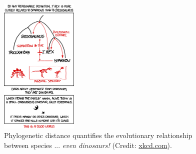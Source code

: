 \documentclass[12pt]{article}
\begin{document}
\begin{figure}
\centering
\includegraphics[width=0.33\textwidth]{figures/birds_and_dinosaurs.png}
\caption{\label{fig:3} Phylogenetic distance quantifies the evolutionary relationship between species ... \textit{even dinosaurs!} (Credit: \url{xkcd.com}).}
\end{figure}



\end{document}
